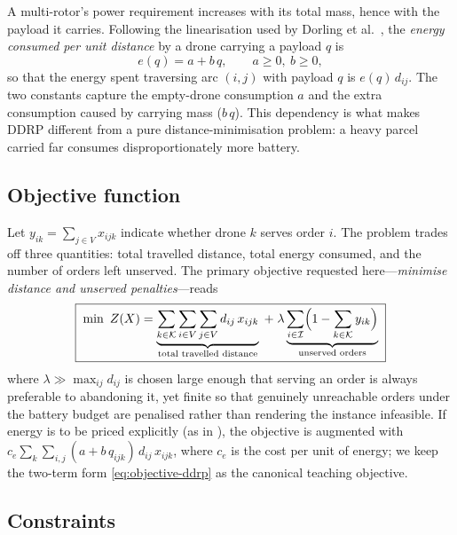 \documentclass[11pt,a4paper]{article}
\begin{document}
A multi-rotor's power requirement increases with its total mass, hence with the
payload it carries. Following the linearisation used by Dorling et al.\
\cite{dorling2016}, the \emph{energy consumed per unit distance} by a drone
carrying a payload $q$ is
\begin{equation}
  e(q) = a + b\,q, \qquad a \ge 0,\ b \ge 0 ,
  \label{eq:energy-rate}
\end{equation}
so that the energy spent traversing arc $(i,j)$ with payload $q$ is
$e(q)\,d_{ij}$. The two constants capture the empty-drone consumption $a$ and
the extra consumption caused by carrying mass ($b\,q$). This dependency is what
makes DDRP different from a pure distance-minimisation problem: a heavy parcel
carried far consumes disproportionately more battery.

\subsection{Objective function}

Let $y_{ik}=\sum_{j\in V} x_{ijk}$ indicate whether drone $k$ serves order $i$.
The problem trades off three quantities: total travelled distance, total energy
consumed, and the number of orders left unserved. The primary objective
requested here---\emph{minimise distance and unserved penalties}---reads
\begin{equation}
  \boxed{\;
  \min \ Z(X)
  = \underbrace{\sum_{k\in\mathcal{K}} \sum_{i\in V} \sum_{j\in V}
      d_{ij}\, x_{ijk}}_{\text{total travelled distance}}
  \;+\; \lambda
    \underbrace{\sum_{i\in\mathcal{I}} \Bigl(1-\sum_{k\in\mathcal{K}} y_{ik}\Bigr)}_{\text{unserved orders}}
  \;}
  \label{eq:objective-ddrp}
\end{equation}
where $\lambda\gg \max_{ij}d_{ij}$ is chosen large enough that serving an order
is always preferable to abandoning it, yet finite so that genuinely
unreachable orders under the battery budget are penalised rather than rendering
the instance infeasible. If energy is to be priced explicitly (as in
\cite{dorling2016}), the objective is augmented with
$c_{e}\sum_{k}\sum_{i,j} (a + b\,q_{ijk})\,d_{ij}\,x_{ijk}$, where $c_{e}$ is
the cost per unit of energy; we keep the two-term form
\eqref{eq:objective-ddrp} as the canonical teaching objective.

\subsection{Constraints}
\end{document}

